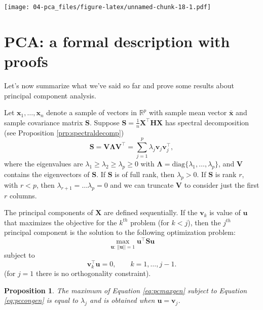 \documentclass[
]{book}
\newtheorem{proposition}{Proposition}[chapter]
\theoremstyle{definition}
\theoremstyle{definition}
\theoremstyle{definition}
\theoremstyle{definition}
\theoremstyle{remark}
\begin{document}
\texttt{[image: 04-pca\_files/figure-latex/unnamed-chunk-18-1.pdf]}

\section{PCA: a formal description with proofs}\label{pca-a-formal-description-with-proofs}

Let's now summarize what we've said so far and prove some results about principal component analysis.

Let \(\mathbf x_1, \ldots , \mathbf x_n\) denote a sample of vectors in \(\mathbb{R}^p\) with sample mean vector \(\bar{\mathbf x}\) and sample covariance matrix \(\mathbf S\). Suppose \(\mathbf S=\frac{1}{n}\mathbf X^\top \mathbf H\mathbf X\) has spectral decomposition (see Proposition \ref{prp:spectraldecomp})
\begin{equation}
\mathbf S=\mathbf V\boldsymbol \Lambda\mathbf V^\top = \sum_{j=1}^p  \lambda_j \mathbf v_j \mathbf v_j^\top,
\label{eq:pcaspect}
\end{equation}
where the eigenvalues are \(\lambda_1 \geq \lambda_2 \geq \lambda_p \geq 0\) with \(\boldsymbol \Lambda=\text{diag}\{\lambda_1, \ldots, \lambda_p\}\), and \(\mathbf V\) contains the eigenvectors of \(\mathbf S\). If \(\mathbf S\) is of full rank, then \(\lambda_p>0\). If \(\mathbf S\) is rank \(r\), with \(r<p\), then \(\lambda_{r+1}=\ldots \lambda_p=0\) and we can truncate \(\mathbf V\) to consider just the first \(r\) columns.

The principal components of \(\mathbf X\) are defined sequentially. If the \(\mathbf v_k\) is value of \(\mathbf u\) that maximizes the objective for the \(k^{th}\) problem (for \(k<j\)), then the \(j^{th}\) principal component is the solution to the following optimization problem:
\begin{equation}
\max_{\mathbf u: \, \vert \vert \mathbf u\vert \vert =1}\mathbf u^\top \mathbf S\mathbf u
\label{eq:pcmaxgen}
\end{equation}
subject to
\begin{equation}
\mathbf v_k^\top \mathbf u=0, \qquad k=1, \ldots , j-1.
\label{eq:pccongen}
\end{equation}
(for \(j=1\) there is no orthogonality constraint).

\begin{proposition}
\protect\hypertarget{prp:pca1}{}\label{prp:pca1}The maximum of Equation \eqref{eq:pcmaxgen}
subject to Equation \eqref{eq:pccongen} is equal to \(\lambda_j\) and is obtained when \(\mathbf u=\mathbf v_j\).
\end{proposition}
\end{document}

